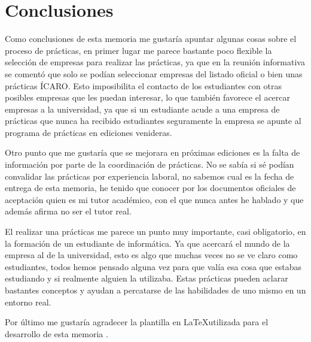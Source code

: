 \chapter{Conclusiones}

Como conclusiones de esta memoria me gustaría apuntar algunas cosas sobre el proceso de prácticas, en primer lugar me parece bastante poco flexible la selección de empresas para realizar las prácticas, ya que en la reunión informativa se comentó que solo se podían seleccionar empresas del listado oficial o bien unas prácticas ÍCARO. Esto imposibilita el contacto de los estudiantes con otras posibles empresas que les puedan interesar, lo que también favorece el acercar empresas a la universidad, ya que si un estudiante acude a una empresa de prácticas que nunca ha recibido estudiantes seguramente la empresa se apunte al programa de prácticas en ediciones venideras. 

Otro punto que me gustaría que se mejorara en próximas ediciones es la falta de información por parte de la coordinación de prácticas. No se sabía si sé podían convalidar las prácticas por experiencia laboral, no sabemos cual es la fecha de entrega de esta memoria, he tenido que conocer por los documentos oficiales de aceptación quien es mi tutor académico, con el que nunca antes he hablado y que además afirma no ser el tutor real.

El realizar una prácticas me parece un punto muy importante, casi obligatorio, en la formación de un estudiante de informática. Ya que acercará el mundo de la empresa al de la universidad, esto es algo que muchas veces no se ve claro como estudiantes, todos hemos pensado alguna vez para que valía esa cosa que estabas estudiando y si realmente alguien la utilizaba. Estas prácticas pueden aclarar bastantes conceptos y ayudan a percatarse de las habilidades de uno mismo en un entorno real.

Por último me gustaría agradecer la plantilla en \LaTeX utilizada para el desarrollo de esta memoria \cite{plantilla_latex}.

